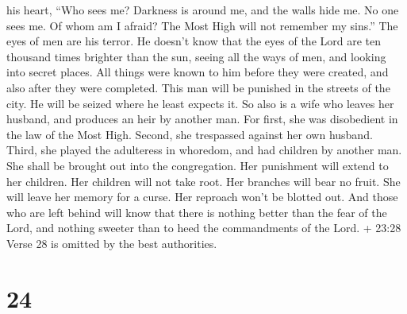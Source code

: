 his heart, ``Who sees me? Darkness is around me, and the walls hide me.
No one sees me. Of whom am I afraid? The Most High will not remember my
sins.''  The eyes of men are his terror. He doesn't know
that the eyes of the Lord are ten thousand times brighter than the sun,
seeing all the ways of men, and looking into secret places.
 All things were known to him before they were created, and
also after they were completed.  This man will be punished
in the streets of the city. He will be seized where he least expects it.
 So also is a wife who leaves her husband, and produces an
heir by another man.  For first, she was disobedient in the
law of the Most High. Second, she trespassed against her own husband.
Third, she played the adulteress in whoredom, and had children by
another man.  She shall be brought out into the
congregation. Her punishment will extend to her children. 
Her children will not take root. Her branches will bear no fruit.
 She will leave her memory for a curse. Her reproach won't
be blotted out.  And those who are left behind will know
that there is nothing better than the fear of the Lord, and nothing
sweeter than to heed the commandments of the Lord.  + 23:28
Verse 28 is omitted by the best authorities.

\hypertarget{section-6}{%
\section{24}\label{section-6}}


